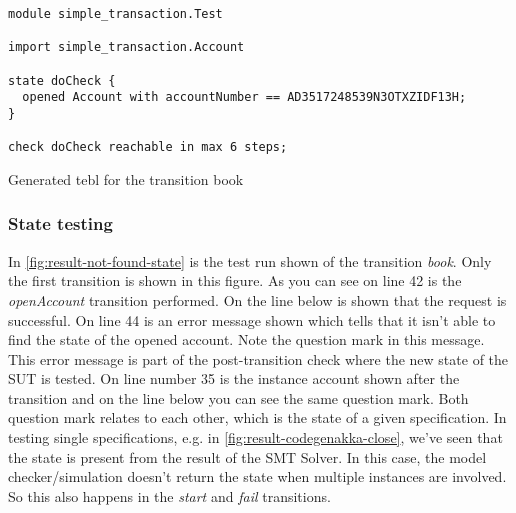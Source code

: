 \begin{sourcecode}[h!]
\begin{lstlisting}[]
module simple_transaction.Test

import simple_transaction.Account

state doCheck {
  opened Account with accountNumber == AD3517248539N3OTXZIDF13H;
}

check doCheck reachable in max 6 steps;
\end{lstlisting}
\caption{Generated tebl for the transition book}
\label{fig:tebl-gen-validated-transaction}
\end{sourcecode}

\subsubsection{State testing}

In \autoref{fig:result-not-found-state} is the test run shown of the transition
\textit{book}. Only the first transition is shown in this figure. As you can
see on line 42 is the \textit{openAccount} transition performed. On the line
below is shown that the request is successful. On line 44 is an error message
shown which tells that it isn't able to find the state of the opened account.
Note the question mark in this message. This error message is part of the
post-transition check where the new state of the SUT is tested. On line number
35 is the instance account shown after the transition and on the line below you
can see the same question mark. Both question mark relates to each other, which
is the state of a given specification. In testing single specifications, e.g. in
\autoref{fig:result-codegenakka-close}, we've seen that the state is present
from the result of the SMT Solver. In this case, the model checker/simulation
doesn't return the state when multiple instances are involved. So this also
happens in the \textit{start} and \textit{fail} transitions.

